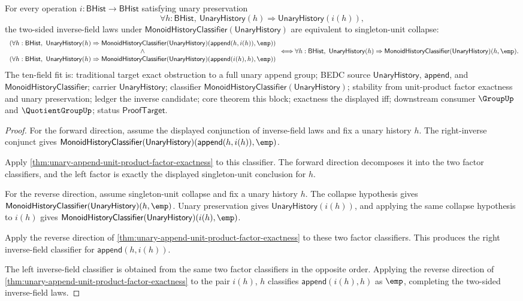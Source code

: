 \begin{theorem}
\label{thm:unary-append-inverse-field-iff-singleton-collapse}
For every operation $i:\mathsf{BHist}\to\mathsf{BHist}$ satisfying unary
preservation
$$
\forall h:\mathsf{BHist},\
\mathsf{UnaryHistory}(h)\Rightarrow\mathsf{UnaryHistory}(i(h)),
$$
the two-sided inverse-field laws under
$\mathsf{MonoidHistoryClassifier}(\mathsf{UnaryHistory})$ are equivalent to
singleton-unit collapse:
$$
\begin{array}{c}
\left(
\forall h:\mathsf{BHist},\
\mathsf{UnaryHistory}(h)\Rightarrow
\mathsf{MonoidHistoryClassifier}(\mathsf{UnaryHistory})
(\mathsf{append}(h,i(h)),\emp)
\right)\\
\land\\
\left(
\forall h:\mathsf{BHist},\
\mathsf{UnaryHistory}(h)\Rightarrow
\mathsf{MonoidHistoryClassifier}(\mathsf{UnaryHistory})
(\mathsf{append}(i(h),h),\emp)
\right)
\end{array}
\Longleftrightarrow
\forall h:\mathsf{BHist},\
\mathsf{UnaryHistory}(h)\Rightarrow
\mathsf{MonoidHistoryClassifier}(\mathsf{UnaryHistory})(h,\emp).
$$
The ten-field fit is: traditional target exact obstruction to a full unary
append group; BEDC source $\mathsf{UnaryHistory}$, $\mathsf{append}$, and
$\mathsf{MonoidHistoryClassifier}$; carrier $\mathsf{UnaryHistory}$;
classifier $\mathsf{MonoidHistoryClassifier}(\mathsf{UnaryHistory})$;
stability from unit-product factor exactness and unary preservation; ledger
the inverse candidate; core theorem this block; exactness the displayed iff;
downstream consumer $\GroupUp$ and $\QuotientGroupUp$; status
$\mathsf{ProofTarget}$.
\end{theorem}
\begin{proof}
For the forward direction, assume the displayed conjunction of inverse-field
laws and fix a unary history $h$. The right-inverse conjunct gives
$\mathsf{MonoidHistoryClassifier}(\mathsf{UnaryHistory})
(\mathsf{append}(h,i(h)),\emp)$.

Apply \autoref{thm:unary-append-unit-product-factor-exactness} to this
classifier. The forward direction decomposes it into the two factor
classifiers, and the left factor is exactly the displayed singleton-unit
conclusion for $h$.

For the reverse direction, assume singleton-unit collapse and fix a unary
history $h$. The collapse hypothesis gives
$\mathsf{MonoidHistoryClassifier}(\mathsf{UnaryHistory})(h,\emp)$. Unary
preservation gives $\mathsf{UnaryHistory}(i(h))$, and applying the same
collapse hypothesis to $i(h)$ gives
$\mathsf{MonoidHistoryClassifier}(\mathsf{UnaryHistory})(i(h),\emp)$.

Apply the reverse direction of
\autoref{thm:unary-append-unit-product-factor-exactness} to these two factor
classifiers. This produces the right inverse-field classifier for
$\mathsf{append}(h,i(h))$.

The left inverse-field classifier is obtained from the same two factor
classifiers in the opposite order. Applying the reverse direction of
\autoref{thm:unary-append-unit-product-factor-exactness} to the pair
$i(h)$, $h$ classifies $\mathsf{append}(i(h),h)$ as $\emp$, completing the
two-sided inverse-field laws.
\end{proof}
